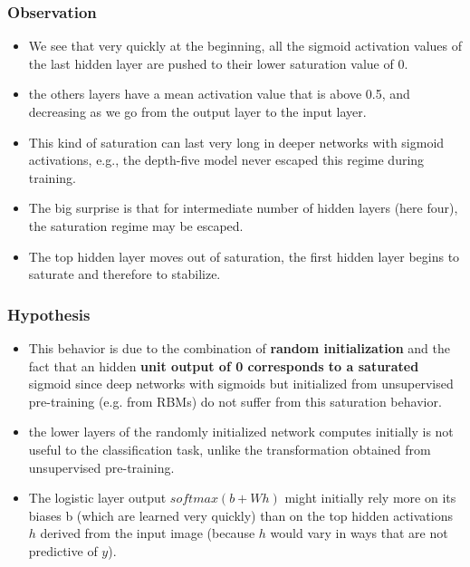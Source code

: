 \begin{frame}
  \frametitle{Observation}

  \begin{itemize}
    \item We see that very quickly at the beginning, all the sigmoid activation values of the last hidden layer are pushed to their lower saturation value of 0.
    
    \item the others layers have a mean activation value that is above 0.5, and decreasing as we go from the output layer to the input layer. 
    
    \item This kind of saturation can last very long in deeper networks with sigmoid activations, e.g., the depth-five model never escaped this regime during training. 
    
    \item The big surprise is that for intermediate number of hidden layers (here four), the saturation regime may be escaped. 
    
    \item The top hidden layer moves out of saturation, the first hidden layer begins to saturate and therefore to stabilize.

  \end{itemize}

\end{frame}

\begin{frame}
  \frametitle{Hypothesis}

  \begin{itemize}
    \item This behavior is due to the combination of \textbf{random initialization} and the fact that an hidden \textbf{unit output of 0 corresponds to a saturated} sigmoid since  deep networks with sigmoids but initialized from unsupervised pre-training (e.g. from RBMs) do not suffer from this saturation behavior.
    
    \item  the lower layers of the randomly initialized network computes initially is not useful to the classification task, unlike the transformation obtained from unsupervised pre-training.
    
    \item The logistic layer output $softmax(b + W h)$ might initially rely more on its biases b (which are learned very quickly) than on the top hidden activations $h$ derived from the input image (because $h$ would vary in ways that are not predictive of $y$). 
  \end{itemize}

\end{frame}


